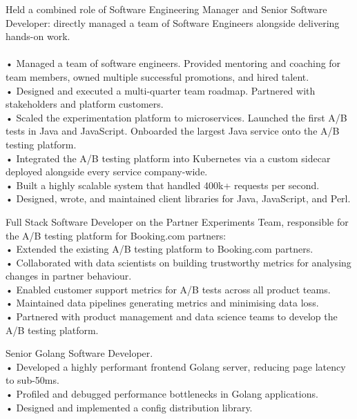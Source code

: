 \documentclass[11pt,a4paper]{moderncv-xetex}
\begin{document}
{
Held a combined role of Software Engineering Manager and Senior Software Developer: directly managed a team of Software Engineers alongside delivering hands-on work.
\\
\\
• Managed a team of software engineers. Provided mentoring and coaching for team members, owned multiple successful promotions, and hired talent.
\\
• Designed and executed a multi-quarter team roadmap. Partnered with stakeholders and platform customers.
\\
• Scaled the experimentation platform to microservices. Launched the first A/B tests in Java and JavaScript. Onboarded the largest Java service onto the A/B testing platform.
\\
• Integrated the A/B testing platform into Kubernetes via a custom sidecar deployed alongside every service company-wide.
\\
• Built a highly scalable system that handled 400k+ requests per second.
\\
• Designed, wrote, and maintained client libraries for Java, JavaScript, and Perl.
}


{
Full Stack Software Developer on the Partner Experiments Team, responsible for the A/B testing platform for Booking.com partners:
\\
• Extended the existing A/B testing platform to Booking.com partners.
\\
• Collaborated with data scientists on building trustworthy metrics for analysing changes in partner behaviour.
\\
• Enabled customer support metrics for A/B tests across all product teams.
\\
• Maintained data pipelines generating metrics and minimising data loss.
\\
• Partnered with product management and data science teams to develop the A/B testing platform.
}
    
{
Senior Golang Software Developer.
\\
• Developed a highly performant frontend Golang server, reducing page latency to sub-50ms.
\\
• Profiled and debugged performance bottlenecks in Golang applications.
\\
• Designed and implemented a config distribution library.
}
    
\end{document}
